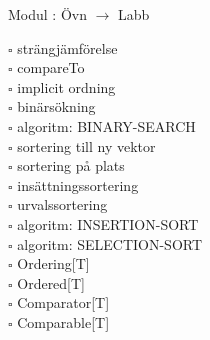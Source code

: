 
    Modul : Övn  $\rightarrow$ Labb 
    \begin{multicols}{3}\SlideFontTiny
    $\square$ strängjämförelse \\
$\square$ compareTo \\
$\square$ implicit ordning \\
$\square$ binärsökning \\
$\square$ algoritm: BINARY-SEARCH \\
$\square$ sortering till ny vektor \\
$\square$ sortering på plats \\
$\square$ insättningssortering \\
$\square$ urvalssortering \\
$\square$ algoritm: INSERTION-SORT \\
$\square$ algoritm: SELECTION-SORT \\
$\square$ Ordering[T] \\
$\square$ Ordered[T] \\
$\square$ Comparator[T] \\
$\square$ Comparable[T] \\
    \end{multicols}
    